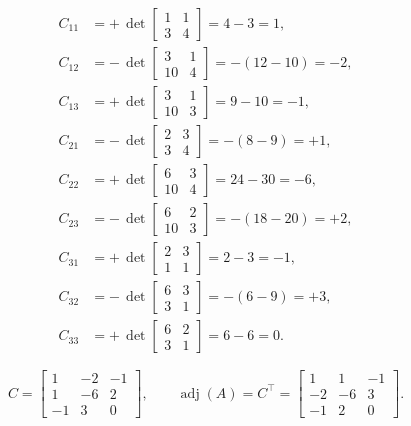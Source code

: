 \documentclass[12pt]{article}
\begin{document}
\[
\begin{aligned}
C_{11} &= +\,\det\!\begin{bmatrix} 1 & 1 \\ 3 & 4 \end{bmatrix} 
       = 4 - 3 = 1, \\[6pt]
C_{12} &= -\,\det\!\begin{bmatrix} 3 & 1 \\ 10 & 4 \end{bmatrix} 
       = -(12 - 10) = -2, \\[6pt]
C_{13} &= +\,\det\!\begin{bmatrix} 3 & 1 \\ 10 & 3 \end{bmatrix} 
       = 9 - 10 = -1, \\[12pt]
C_{21} &= -\,\det\!\begin{bmatrix} 2 & 3 \\ 3 & 4 \end{bmatrix} 
       = -(8 - 9) = +1, \\[6pt]
C_{22} &= +\,\det\!\begin{bmatrix} 6 & 3 \\ 10 & 4 \end{bmatrix} 
       = 24 - 30 = -6, \\[6pt]
C_{23} &= -\,\det\!\begin{bmatrix} 6 & 2 \\ 10 & 3 \end{bmatrix} 
       = -(18 - 20) = +2, \\[12pt]
C_{31} &= +\,\det\!\begin{bmatrix} 2 & 3 \\ 1 & 1 \end{bmatrix} 
       = 2 - 3 = -1, \\[6pt]
C_{32} &= -\,\det\!\begin{bmatrix} 6 & 3 \\ 3 & 1 \end{bmatrix} 
       = -(6 - 9) = +3, \\[6pt]
C_{33} &= +\,\det\!\begin{bmatrix} 6 & 2 \\ 3 & 1 \end{bmatrix} 
       = 6 - 6 = 0.
\end{aligned}
\]

\[
C =
\begin{bmatrix}
1 & -2 & -1 \\
1 & -6 & 2 \\
-1 & 3 & 0
\end{bmatrix},
\qquad
\operatorname{adj}(A) = C^{\top} =
\begin{bmatrix}
1 & 1 & -1 \\
-2 & -6 & 3 \\
-1 & 2 & 0
\end{bmatrix}.
\]
\end{document}
